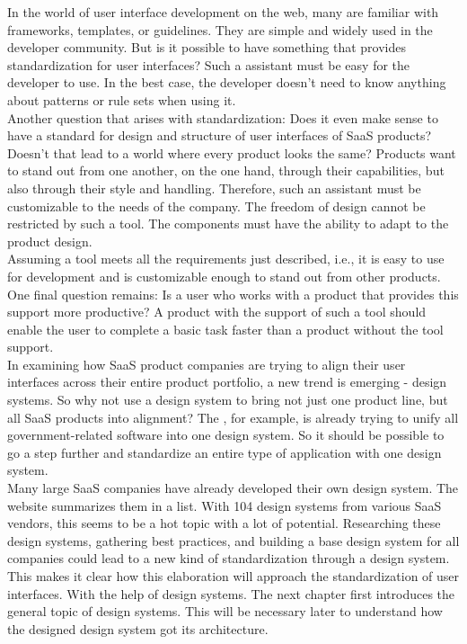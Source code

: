 In the world of user interface development on the web, many are familiar with frameworks, templates, or guidelines. They are simple and widely used in the developer community. But is it possible to have something that provides standardization for user interfaces? Such a assistant must be easy for the developer to use. In the best case, the developer doesn't need to know anything about patterns or rule sets when using it. \\
Another question that arises with standardization: Does it even make sense to have a standard for design and structure of user interfaces of \ac{SaaS} products? Doesn't that lead to a world where every product looks the same? Products want to stand out from one another, on the one hand, through their capabilities, but also through their style and handling. Therefore, such an assistant must be customizable to the needs of the company. The freedom of design cannot be restricted by such a tool. The components must have the ability to adapt to the product design. \\
Assuming a tool meets all the requirements just described, i.e., it is easy to use for development and is customizable enough to stand out from other products. One final question remains: Is a user who works with a product that provides this support more productive? A product with the support of such a tool should enable the user to complete a basic task faster than a product without the tool support. \\
In examining how \ac{SaaS} product companies are trying to align their user interfaces across their entire product portfolio, a new trend is emerging - design systems. So why not use a design system to bring not just one product line, but all \ac{SaaS} products into alignment? The , for example, is already trying to unify all government-related software into one design system. So it should be possible to go a step further and standardize an entire type of application with one design system. \\
Many large \ac{SaaS} companies have already developed their own design system. The  website summarizes them in a list. With 104 design systems from various \ac{SaaS} vendors, this seems to be a hot topic with a lot of potential. Researching these design systems, gathering best practices, and building a base design system for all companies could lead to a new kind of standardization through a design system. \\

This makes it clear how this elaboration will approach the standardization of user interfaces. With the help of design systems. The next chapter first introduces the general topic of design systems. This will be necessary later to understand how the designed design system got its architecture.